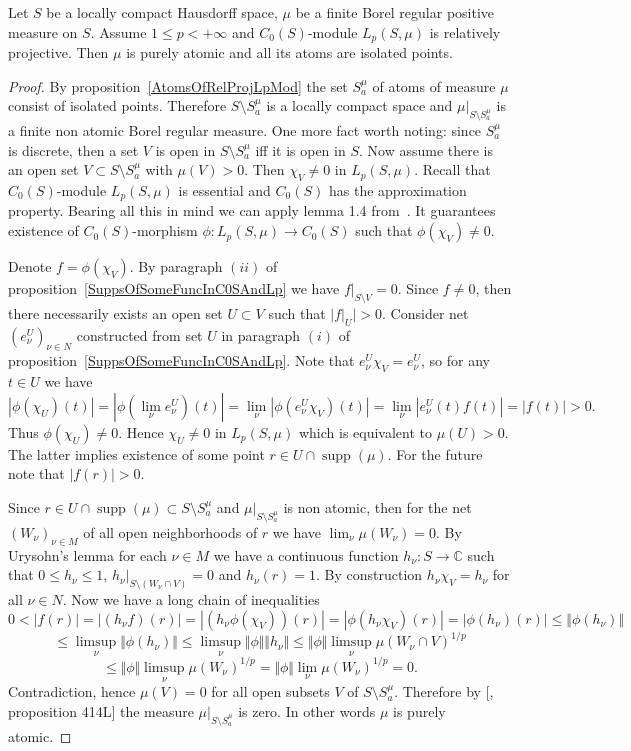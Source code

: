 \begin{proposition}\label{RelProjLpModImplsPureAtomMeas} Let $S$ be a locally
compact Hausdorff space, $\mu$ be a finite Borel regular positive measure on
$S$. Assume $1\leq p<+\infty$ and $C_0(S)$-module $L_p(S,\mu)$ is relatively
projective. Then $\mu$ is purely atomic and all its atoms are isolated points.
\end{proposition}
\begin{proof} By proposition~\ref{AtomsOfRelProjLpMod} the set $S_a^{\mu}$ of
atoms of measure $\mu$ consist of isolated points. Therefore $S\setminus
S_a^{\mu}$ is a locally compact space and $\mu|_{S\setminus S_a^{\mu}}$ is a
finite non atomic Borel regular measure. One more fact worth noting:  since
$S_a^{\mu}$ is discrete, then a set $V$ is open in $S\setminus S_a^{\mu}$ iff it
is open in $S$. Now assume there is an open set $V\subset S\setminus S_a^{\mu}$
with $\mu(V)>0$. Then $\chi_V\neq 0$ in $L_p(S,\mu)$. Recall that
$C_0(S)$-module $L_p(S,\mu)$ is essential and $C_0(S)$ has the approximation
property. Bearing all this in mind we can apply lemma 1.4
from~\cite{SelivBiproBanAlg}. It guarantees existence of $C_0(S)$-morphism
$\phi:L_p(S,\mu)\to C_0(S)$ such that $\phi(\chi_V)\neq 0$. 

Denote $f=\phi(\chi_V)$. By paragraph $(ii)$ of
proposition~\ref{SuppsOfSomeFuncInC0SAndLp} we have $f|_{S\setminus V}=0$. Since
$f\neq 0$, then there necessarily exists an open set $U\subset V$ such that
$|f|_U|> 0$. Consider net ${(e_\nu^U)}_{\nu\in N}$ constructed from set $U$ in
paragraph $(i)$ of proposition~\ref{SuppsOfSomeFuncInC0SAndLp}. Note that
$e_\nu^U\chi_V=e_\nu^U$, so for any $t\in U$ we have
$$
|\phi(\chi_U)(t)|
=|\phi(\lim_\nu e_\nu^U)(t)|
=\lim_\nu|\phi(e_\nu^U\chi_V)(t)|
=\lim_\nu |e_\nu^U(t)f(t)|=|f(t)|
>0.
$$ 
Thus $\phi(\chi_U)\neq 0$. Hence $\chi_U\neq 0$ in $L_p(S,\mu)$ which is
equivalent to $\mu(U)>0$. The latter implies existence of some point $r\in
U\cap\operatorname{supp}(\mu)$. For the future note that $|f(r)|>0$.

Since $r\in U\cap\operatorname{supp}(\mu)\subset S\setminus S_a^{\mu}$ and
$\mu|_{S\setminus S_a^{\mu}}$ is non atomic, then for the 
net ${(W_\nu)}_{\nu\in M}$ of all open neighborhoods of $r$ we 
have $\lim_\nu\mu(W_\nu)=0$. By Urysohn's lemma for each $\nu\in M$ we have 
a continuous function $h_\nu:S\to\mathbb{C}$ such 
that $0\leq h_\nu\leq 1$, $h_\nu|_{S\setminus (W_\nu\cap V)}=0$ 
and $h_\nu(r)=1$. By construction $h_\nu\chi_V=h_\nu$ for all $\nu\in N$. 
Now we have a long chain of inequalities
$$
0<|f(r)|
=|(h_\nu f)(r)|
=|(h_\nu \phi(\chi_V))(r)|
=|\phi(h_\nu\chi_V)(r)|
=|\phi(h_\nu)(r)|
\leq\Vert\phi(h_\nu)\Vert
$$
$$
\leq\limsup_\nu\Vert\phi(h_\nu)\Vert
\leq\limsup_\nu\Vert\phi\Vert\Vert h_\nu\Vert
\leq\Vert\phi\Vert\limsup_\nu{\mu(W_\nu\cap V)}^{1/p}
$$
$$
\leq\Vert\phi\Vert\limsup_\nu{\mu(W_\nu)}^{1/p}
=\Vert\phi\Vert\lim_\nu{\mu(W_\nu)}^{1/p}
=0.
$$
Contradiction, hence $\mu(V)=0$ for all open subsets $V$ of 
$S\setminus S_a^{\mu}$. Therefore by [\cite{FremMeasTh}, proposition 414L] 
the measure $\mu|_{S\setminus S_a^{\mu}}$ is zero. In other 
words $\mu$ is purely atomic.
\end{proof}

